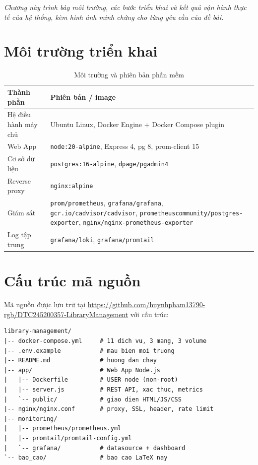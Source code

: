 \documentclass[../main.tex]{subfiles}
\begin{document}
\textit{Chương này trình bày môi trường, các bước triển khai và kết quả vận hành thực tế của hệ thống, kèm hình ảnh minh chứng cho từng yêu cầu của đề bài.}

\section{Môi trường triển khai}
\begin{table}[H]
\centering
\caption{Môi trường và phiên bản phần mềm}
\label{tab:moi-truong}
\begin{tabular}{|p{4.5cm}|p{9.5cm}|}
\hline
\textbf{Thành phần} & \textbf{Phiên bản / image} \\
\hline
Hệ điều hành máy chủ & Ubuntu Linux, Docker Engine + Docker Compose plugin \\ \hline
Web App & \texttt{node:20-alpine}, Express 4, pg 8, prom-client 15 \\ \hline
Cơ sở dữ liệu & \texttt{postgres:16-alpine}, \texttt{dpage/pgadmin4} \\ \hline
Reverse proxy & \texttt{nginx:alpine} \\ \hline
Giám sát & \texttt{prom/prometheus}, \texttt{grafana/grafana}, \texttt{gcr.io/cadvisor/cadvisor}, \texttt{prometheuscommunity/postgres-exporter}, \texttt{nginx/nginx-prometheus-exporter} \\ \hline
Log tập trung & \texttt{grafana/loki}, \texttt{grafana/promtail} \\ \hline
\end{tabular}
\end{table}

\section{Cấu trúc mã nguồn}
Mã nguồn được lưu trữ tại \url{https://github.com/huynhpham13790-rgb/DTC245200357-LibraryManagement} với cấu trúc:
\begin{Verbatim}
library-management/
|-- docker-compose.yml     # 11 dich vu, 3 mang, 3 volume
|-- .env.example           # mau bien moi truong
|-- README.md              # huong dan chay
|-- app/                   # Web App Node.js
|   |-- Dockerfile         # USER node (non-root)
|   |-- server.js          # REST API, xac thuc, metrics
|   `-- public/            # giao dien HTML/JS/CSS
|-- nginx/nginx.conf       # proxy, SSL, header, rate limit
|-- monitoring/
|   |-- prometheus/prometheus.yml
|   |-- promtail/promtail-config.yml
|   `-- grafana/           # datasource + dashboard
`-- bao_cao/               # bao cao LaTeX nay
\end{Verbatim}
\end{document}
